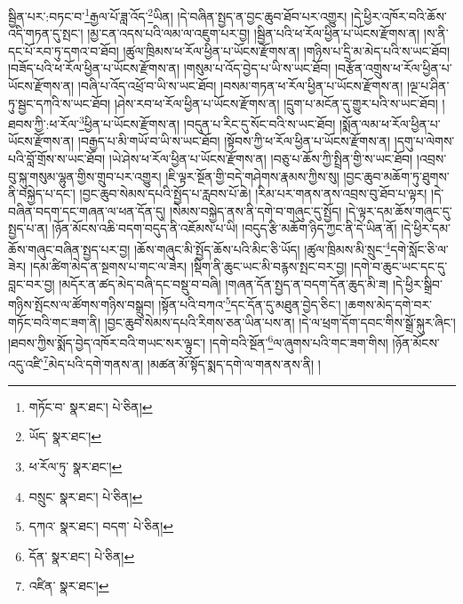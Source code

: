 སྦྱིན་པར་:བཏང་བ་\footnote{གཏོང་བ་  སྣར་ཐང་།  པེ་ཅིན། }རྒྱལ་པོ་ཟླ་འོད་\footnote{ཡོད་  སྣར་ཐང་། }ཡིན། །དེ་བཞིན་སྤྱད་ན་བྱང་ཆུབ་ཐོབ་པར་འགྱུར། །དེ་ཕྱིར་འཁོར་བའི་ཆོས་འདི་གཏན་དུ་སྤང་། །མྱ་ངན་འདས་པའི་ལམ་ལ་འཇུག་པར་བྱ། །སྦྱིན་པའི་ཕ་རོལ་ཕྱིན་པ་ཡོངས་རྫོགས་ན། །ས་ནི་དང་པོ་རབ་ཏུ་དགའ་བ་ཐོབ། །ཚུལ་ཁྲིམས་ཕ་རོལ་ཕྱིན་པ་ཡོངས་རྫོགས་ན། །གཉིས་པ་དྲི་མ་མེད་པའི་ས་ཡང་ཐོབ། །བཟོད་པའི་ཕ་རོལ་ཕྱིན་པ་ཡོངས་རྫོགས་ན། །གསུམ་པ་འོད་བྱེད་པ་ཡི་ས་ཡང་ཐོབ། །བརྩོན་འགྲུས་ཕ་རོལ་ཕྱིན་པ་ཡོངས་རྫོགས་ན། །བཞི་པ་འོད་འཕྲོ་བ་ཡི་ས་ཡང་ཐོབ། །བསམ་གཏན་ཕ་རོལ་ཕྱིན་པ་ཡོངས་རྫོགས་ན། །ལྔ་པ་ཤིན་ཏུ་སྦྱང་དཀའི་ས་ཡང་ཐོབ། །ཤེས་རབ་ཕ་རོལ་ཕྱིན་པ་ཡོངས་རྫོགས་ན། །དྲུག་པ་མངོན་དུ་གྱུར་པའི་ས་ཡང་ཐོབ། །ཐབས་ཀྱི་:ཕ་རོལ་\footnote{ཕ་རོལ་ཏུ་  སྣར་ཐང་། }ཕྱིན་པ་ཡོངས་རྫོགས་ན། །བདུན་པ་རིང་དུ་སོང་བའི་ས་ཡང་ཐོབ། །སྨོན་ལམ་ཕ་རོལ་ཕྱིན་པ་ཡོངས་རྫོགས་ན། །བརྒྱད་པ་མི་གཡོ་བ་ཡི་ས་ཡང་ཐོབ། །སྟོབས་ཀྱི་ཕ་རོལ་ཕྱིན་པ་ཡོངས་རྫོགས་ན། །དགུ་པ་ལེགས་པའི་བློ་གྲོས་ས་ཡང་ཐོབ། །ཡེ་ཤེས་ཕ་རོལ་ཕྱིན་པ་ཡོངས་རྫོགས་ན། །བཅུ་པ་ཆོས་ཀྱི་སྤྲིན་གྱི་ས་ཡང་ཐོབ། །འབྲས་བུ་སྐུ་གསུམ་ལྷུན་གྱིས་གྲུབ་པར་འགྱུར། །ཇི་ལྟར་སྔོན་གྱི་བདེ་གཤེགས་རྣམས་ཀྱིས་སུ། །བྱང་ཆུབ་མཆོག་ཏུ་ཐུགས་ནི་བསྐྱེད་པ་དང་། །བྱང་ཆུབ་སེམས་དཔའི་སྤྱོད་པ་རླབས་པོ་ཆེ། །རིམ་པར་གནས་ནས་འབྲས་བུ་ཐོབ་པ་ལྟར། །དེ་བཞིན་བདག་དང་གཞན་ལ་ཕན་དོན་དུ། །སེམས་བསྐྱེད་ནས་ནི་དགེ་བ་གཞུང་དུ་སྤྱོད། །དེ་ལྟར་དམ་ཆོས་གཞུང་དུ་སྤྱད་པ་ན། །ཉོན་མོངས་འཆི་བདག་བདུད་ནི་འཇོམས་པ་ཡི། །བདུད་རྩི་མཆོག་ཉིད་ཀྱང་ནི་དེ་ཡིན་ནོ། །དེ་ཕྱིར་དམ་ཆོས་གཞུང་བཞིན་སྤྱད་པར་བྱ། །ཆོས་གཞུང་མི་སྤྱོད་ཆོས་པའི་མིང་ཅི་ཡོད། །ཚུལ་ཁྲིམས་མི་སྲུང་\footnote{བསྲུང་  སྣར་ཐང་།  པེ་ཅིན། }དགེ་སློང་ཅི་ལ་ཟེར། །དམ་ཚིག་མེད་ན་སྔགས་པ་གང་ལ་ཟེར། །སྡིག་ནི་ཆུང་ཡང་མི་བརྙས་སྤང་བར་བྱ། །དགེ་བ་ཆུང་ཡང་དང་དུ་བླང་བར་བྱ། །མདོར་ན་ཚད་མེད་བཞི་དང་བསྡུ་བ་བཞི། །གཞན་དོན་སྤྱད་ན་བདག་དོན་ཆུད་མི་ཟ། །དེ་ཕྱིར་སྒྲིབ་གཉིས་སྤོངས་ལ་ཚོགས་གཉིས་བསྒྲུབ། །སྟོན་པའི་བཀའ་\footnote{དཀའ་  སྣར་ཐང་། བདག་  པེ་ཅིན། }དང་དོན་དུ་མཐུན་བྱེད་ཅིང་། །ཆགས་མེད་དགེ་བར་གཏོང་བའི་གང་ཟག་ནི། །བྱང་ཆུབ་སེམས་དཔའི་རིགས་ཅན་ཡིན་པས་ན། །དེ་ལ་ཕྲག་དོག་དབང་གིས་སྒྲོ་སྐུར་ཞིང་། །ཐབས་ཀྱིས་སྨོད་བྱེད་འཁོར་བའི་གཡང་སར་ལྟུང་། །དགེ་བའི་སྔོན་\footnote{དོན་  སྣར་ཐང་།  པེ་ཅིན། }ལ་ཞུགས་པའི་གང་ཟག་གིས། །ཉོན་མོངས་འདུ་འཛི་\footnote{འཛིན་  སྣར་ཐང་། }མེད་པའི་དགེ་གནས་ན། །མཚན་མོ་སྟོད་སྨད་དགེ་ལ་གནས་ནས་ནི། །
